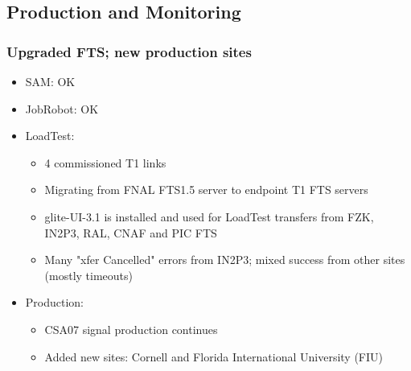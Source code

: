 \documentclass{beamer}
\begin{document}
\subsection{Production and Monitoring}
\begin{frame}
\frametitle{Upgraded FTS; new production sites}
\begin{itemize}
    \item SAM: OK
    \item JobRobot: OK
    \item LoadTest:
    \begin{itemize}
        \item 4 commissioned T1 links
        \item Migrating from FNAL FTS1.5 server to endpoint T1 FTS servers
        \item glite-UI-3.1 is installed and used for LoadTest transfers from FZK, IN2P3, RAL, CNAF and PIC FTS
        \item Many "xfer Cancelled" errors from IN2P3; mixed success from other sites (mostly timeouts)
    \end{itemize}
    \item Production:
    \begin{itemize}
        \item CSA07 signal production continues
        \item Added new sites: Cornell and Florida International University (FIU)
    \end{itemize}
\end{itemize}
\end{frame}
\end{document}
